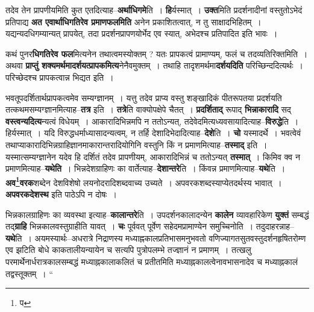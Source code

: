 \documentclass[article,12pt,a4paper]{memoir}
\begin{document}
	  \endgroup
	

	  \pstart तदेव तेन प्रापणीयमिति कुत एतदित्याह--\textbf{अर्थाधिगमे}ति । \textbf{हि}र्यस्मात् । \textbf{उक्त}मिति प्रदर्शनादीनां वस्तुतोऽभेदं प्रतिपाद्य \textbf{अत एवार्थाधिगतिरेव प्रमाणफलमिति} अनेन प्रकाशितत्वात्, न तु साक्षादभिहितम् । यद्यन्यदधिगम्यान्यत् प्रापयेत्, तदा प्रदर्शनप्रापणयोर्भेद एव स्यात्, अभेदश्च प्रतिपादित इति भावः ।
	\pend
      

	  \pstart कथं पुनर\textbf{धिगतिरेव फल}मित्यनेन तथात्वमस्योक्तम् ? यतः प्रापकत्वं प्रामाण्यम्, फलं च तदव्यतिरिक्तमिति । अथवा \textbf{प्राप्तुं शक्यमर्थमादर्शयत्प्रापकमित्य}नेनैवमुक्तम् । तथाहि तादृशमर्थमा\textbf{दर्शयदिति} परिच्छिन्ददित्यर्थः । परिच्छेदश्च प्रापकत्वान्न भिद्यत इति ।
	\pend
      

	  \pstart भवतूपदर्शितार्थप्रापकत्वमेव सम्यग्ज्ञानम् । यत्तु तदेव प्राप्य वस्तु शङ्खादिकं पीतरूपतया प्रदर्शयति तत्कथमसम्यग्ज्ञानमित्याह--\textbf{तत्र} इति । \textbf{तत्रे}ति वाक्योपक्षेपे चैतत् । \textbf{प्रदर्शिताद्} रूपाद् \textbf{भिन्नाकारादि} सद् \textbf{वस्त्वन्यदित्य}न्यत्वं विधेयम् । आकारादिभिन्नमपि न ततोऽन्यत्, तदेवेदमित्यध्यवसायादित्याह--\textbf{विरुद्धे}ति । हिर्यस्मात् । यदि विरुद्धधर्माध्यासादन्यत्वम्, न तर्हि देशादिभेदादित्याह--\textbf{देशे}ति । \textbf{चो} यस्मादर्थे । भवत्वेवं तथाप्याकारादिभिन्नग्राहिज्ञानमाकारान्तरादियोगिनि वस्तुनि किं न प्रमाणमित्याह--\textbf{तस्माद्} इति । यस्मात्सम्यग्ज्ञानेन यदेव हि दर्शितं तदेव प्रापणीयम्, आकारादिभिन्नं च ततोऽन्यत् \textbf{तस्मात्} । किमिव क्व न प्रमाणमित्याह--\textbf{यथेति} । भिन्नदेशग्राहिणः का वार्तेत्याह--\textbf{देशान्तरे}ति । किंवन्न प्रमाणमित्याह--\textbf{यथे}ति । \textbf{अव\footnote{प}वरक}शब्देन देशविशेषो लयनोदरादिशब्दवाच्य उच्यते । अपवरकशब्दस्याप्येतदर्थस्य भावात् । \textbf{अपवरकदेशस्थ} इति पाठेऽपि न दोषः ।
	\pend
      

	  \pstart भिन्नकालग्राहिणः का व्यवस्था इत्याह--\textbf{कालान्तरे}ति । उपदर्शनकालादन्येन \textbf{कालेन} व्यावहारिकेण \textbf{युक्तं} सम्बद्धं तद्\textbf{ग्राहि} भिन्नकालवस्तुग्राहीति यावत् । \textbf{चः} पूर्ववत् पूर्वेण सहेदमप्रामाण्येन समुच्चिनोति । तदुदाहरन्नाह--\textbf{यथे}ति । अयमस्यार्थः--अधरात्रे निद्राणस्य मध्याह्नकालप्रतिभासमनुभवतो वणिज्यागतसुतवस्तुदर्शनहृषितरोम्ण एव झटिति बोधे काकतालीयन्यायेन च सत्यपि पुत्रोपलम्भे तज्ज्ञानं न प्रमाणम् । तत्खलु परमार्थेनार्धरात्रकालसम्बद्धं मध्याह्नकालाकलितं च प्रतीतमिति मध्याह्नकालत्वेनावभासनादेव च मध्याह्नकालं तद्वस्तूक्तम् ।  \leavevmode{} “
	  
\end{document}
